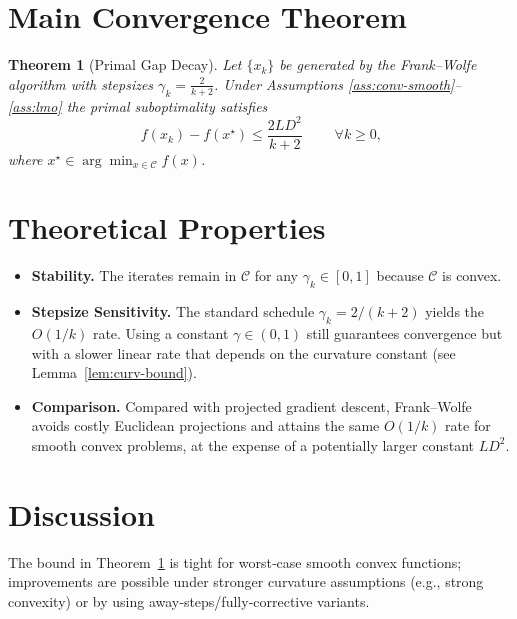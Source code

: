 \documentclass{article}
\newtheorem{theorem}{Theorem}
\begin{document}
\section*{Main Convergence Theorem}
\begin{theorem}[Primal Gap Decay]\label{thm:fw-rate}
Let $\{x_k\}$ be generated by the Frank–Wolfe algorithm with stepsizes $\gamma_k= \frac{2}{k+2}$. Under Assumptions \ref{ass:conv-smooth}–\ref{ass:lmo} the primal suboptimality satisfies
\[
\boxed{ \; f(x_k)-f(x^\star) \le \frac{2 L D^{2}}{k+2}\; } \qquad\forall k\ge 0,
\]
where $x^\star\in\arg\min_{x\in\mathcal{C}} f(x)$.
\end{theorem}

\section*{Theoretical Properties}
\begin{itemize}
\item \textbf{Stability.} The iterates remain in $\mathcal{C}$ for any $\gamma_k\in[0,1]$ because $\mathcal{C}$ is convex.
\item \textbf{Stepsize Sensitivity.} The standard schedule $\gamma_k=2/(k+2)$ yields the $O(1/k)$ rate. Using a constant $\gamma\in(0,1)$ still guarantees convergence but with a slower linear rate that depends on the curvature constant (see Lemma~\ref{lem:curv-bound}).
\item \textbf{Comparison.} Compared with projected gradient descent, Frank–Wolfe avoids costly Euclidean projections and attains the same $O(1/k)$ rate for smooth convex problems, at the expense of a potentially larger constant $LD^2$.
\end{itemize}

\section*{Discussion}
The bound in Theorem~\ref{thm:fw-rate} is tight for worst‑case smooth convex functions; improvements are possible under stronger curvature assumptions (e.g., strong convexity) or by using away‑steps/fully‑corrective variants.

\newpage
\end{document}
